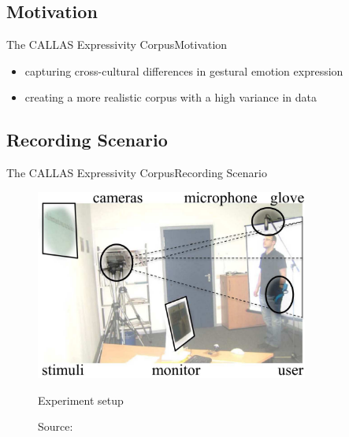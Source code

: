 \documentclass{beamer}
\begin{document}
		\subsection{Motivation}
			\begin{frame}{The CALLAS Expressivity Corpus}{Motivation}			
				\begin{itemize}
					\item capturing cross-cultural differences in gestural emotion expression
					\item creating a more realistic corpus with a high variance in data
				\end{itemize}											
			\end{frame}		
				
		\subsection{Recording Scenario}
			\begin{frame}{The CALLAS Expressivity Corpus}{Recording Scenario}																\begin{figure}
					\includegraphics[width=0.8\textwidth]{images/Callas/experimentSetup}
					\caption{Experiment setup}
					\vspace*{-10pt}
					\caption*{Source: \cite{2010MultimodalCorpusForGestureExpressivity}}
				\end{figure}
			\end{frame}
		
\end{document}

